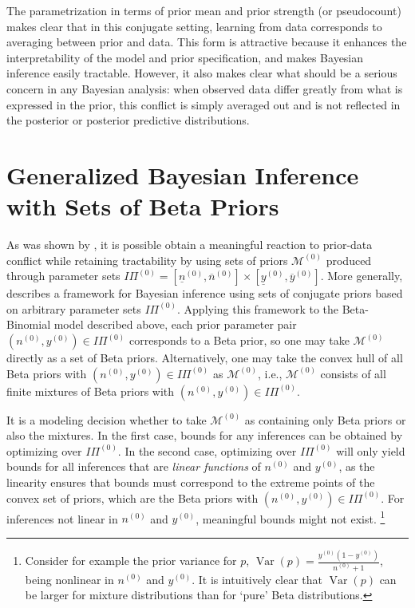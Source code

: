 \documentclass[runningheads,a4paper]{llncs}
\newcommand{\uz}{^{(0)}} %
\newcommand{\ul}[1]{\underline{#1}}
\newcommand{\ol}[1]{\overline{#1}}
\def\yz{y\uz}
\def\yzl{\ul{y}\uz}
\def\yzu{\ol{y}\uz}
\def\nz{n\uz}
\def\nzl{\ul{n}\uz}
\def\nzu{\ol{n}\uz}
\def\PZ{I\!\!\Pi\uz}
\def\MZ{\mathcal{M}\uz}
\newcommand{\V}{\operatorname{Var}}
\begin{document}
The parametrization in terms of prior mean and prior strength (or pseudocount)
makes clear that in this conjugate setting,
learning from data corresponds to averaging between prior and data.
This form is attractive because it enhances the interpretability of the model and prior specification,
and makes Bayesian inference easily tractable.
However, it also makes clear what should be a serious concern in any Bayesian analysis:
when observed data differ greatly from what is expressed in the prior,
this conflict is simply averaged out
and is not reflected in the posterior or posterior predictive distributions.







\section{Generalized Bayesian Inference with Sets of Beta Priors}
\label{sec:setsofbetapriors}

As was shown by \cite{Walter2009a}, %
it is possible obtain a meaningful reaction to prior-data conflict while retaining tractability
by using sets of priors $\MZ$ produced through parameter sets $\PZ = [\nzl, \nzu] \times [\yzl, \yzu]$.
More generally, \cite[\S 3.1]{2013:diss-gw} describes a framework for
Bayesian inference using sets of conjugate priors based on arbitrary parameter sets $\PZ$.
Applying this framework to the Beta-Binomial model described above,
each prior parameter pair $(\nz, \yz) \in \PZ$ corresponds to a Beta prior,
so one may take $\MZ$ directly as a set of Beta priors.
Alternatively, one may take the convex hull of all Beta priors with $(\nz, \yz) \in \PZ$ as $\MZ$,
i.e., $\MZ$ consists of all finite mixtures of Beta priors with $(\nz, \yz) \in \PZ$.

It is a modeling decision whether to take $\MZ$ as containing only Beta priors or also the mixtures.
In the first case, bounds for any inferences can be obtained by optimizing over $\PZ$.
In the second case, optimizing over $\PZ$ will only yield bounds for all inferences
that are \emph{linear functions} of $\nz$ and $\yz$,
as the linearity ensures that bounds must correspond to the extreme points of the convex set of priors,
which are the Beta priors with $(\nz, \yz) \in \PZ$.
For inferences not linear in $\nz$ and $\yz$, meaningful bounds might not exist.%
\footnote{Consider for example the prior variance for $p$, $\V(p) = \frac{\yz (1-\yz)}{\nz + 1}$,
being nonlinear in $\nz$ and $\yz$.
It is intuitively clear that $\V(p)$ can be larger for mixture distributions than for `pure' Beta distributions.}
\end{document}
